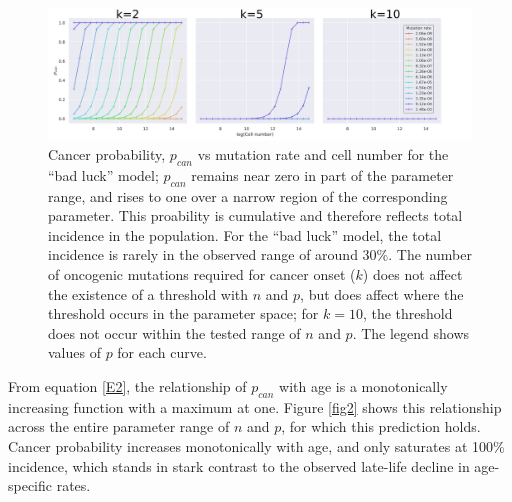 \documentclass[9pt,twocolumn,twoside]{pnas-new}
\begin{document}
\begin{figure}[tbhp]
	\centering
	\includegraphics[width=.8\linewidth]{fig1.png}
	\caption{Cancer probability, $p_{can}$ vs mutation rate and cell number for the ``bad luck'' model; $p_{can}$ remains near zero in part of the parameter range, and rises to one over a narrow region of the corresponding parameter. This proability is cumulative and therefore reflects total incidence in the population. For the ``bad luck'' model, the total incidence is rarely in the observed range of around 30\%. The number of oncogenic mutations required for cancer onset ($k$) does not affect the existence of a threshold with $n$ and $p$, but does affect where the threshold occurs in the parameter space; for $k=10$, the threshold does not occur within the tested range of $n$ and $p$. The legend shows values of $p$ for each curve.}
	\label{fig1}
\end{figure}

From equation \ref{E2}, the relationship of $p_{can}$ with age is a monotonically increasing function with a maximum at one. Figure \ref{fig2} shows this relationship across the entire parameter range of $n$ and $p$, for which this prediction holds. Cancer probability increases monotonically with age, and only saturates at 100\% incidence, which stands in stark contrast to the observed late-life decline in age-specific rates.
\end{document}
